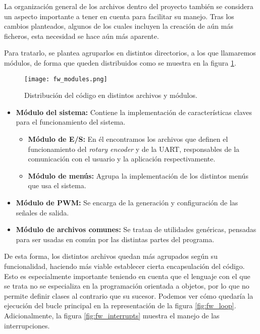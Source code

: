 La organización general de los archivos dentro del proyecto también se considera un aspecto importante a tener en cuenta para facilitar su manejo. Tras los cambios planteados, algunos de los cuales incluyen la creación de aún más ficheros, esta necesidad se hace aún más aparente.

Para tratarlo, se plantea agruparlos en distintos directorios, a los que llamaremos módulos, de forma que queden distribuidos como se muestra en la figura \ref{fig:fw_modules}.

\begin{figure}[h!]
    \centering
	\texttt{[image: fw\_modules.png]}
	\caption{Distribución del código en distintos archivos y módulos.}
    \label{fig:fw_modules}
\end{figure}

\begin{itemize}
    \item\textbf{Módulo del sistema:} Contiene la implementación de características claves para el funcionamiento del sistema.
        \begin{itemize}
            \item\textbf{Módulo de E/S:} En él encontramos los archivos que definen el funcionamiento del \textit{rotary encoder} y de la UART, responsables de la comunicación con el usuario y la aplicación respectivamente.
            \item\textbf{Módulo de menús:} Agrupa la implementación de los distintos menús que usa el sistema.
        \end{itemize}
    \item\textbf{Módulo de PWM:} Se encarga de la generación y configuración de las señales de salida.
    \item\textbf{Módulo de archivos comunes:} Se tratan de utilidades genéricas, pensadas para ser usadas en común por las distintas partes del programa.
\end{itemize}

De esta forma, los distintos archivos quedan más agrupados según su funcionalidad, haciendo más viable establecer cierta encapsulación del código. Esto es especialmente importante teniendo en cuenta que el lenguaje con el que se trata no se especializa en la programación orientada a objetos, por lo que no permite definir clases al contrario que su sucesor. Podemos ver cómo quedaría la ejecución del bucle principal en la representación de la figura \ref{fig:fw_loop}. Adicionalmente, la figura \ref{fig:fw_interrupts} muestra el manejo de las interrupciones.

